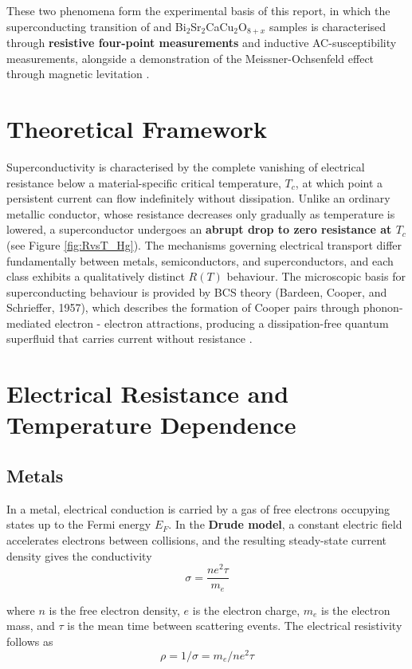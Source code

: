 \documentclass[a4paper,11pt]{article}
\numberwithin{equation}{section}
\begin{document}
These two phenomena form the experimental basis of this report, in which the 
superconducting transition of  and Bi$_2$Sr$_2$CaCu$_2$O$_{8+x}$ samples
is characterised through \textbf{resistive four-point measurements} and inductive 
AC-susceptibility measurements, alongside a demonstration of the 
Meissner-Ochsenfeld effect through magnetic levitation \cite{experiment}.


\newpage

\section{Theoretical Framework}
Superconductivity is characterised by the complete vanishing of electrical 
resistance below a material-specific critical temperature, $T_c$, at which 
point a persistent current can flow indefinitely without dissipation. 
Unlike an ordinary metallic conductor, whose resistance decreases only 
gradually as temperature is lowered, a superconductor undergoes an \textbf{abrupt 
drop to zero resistance at $T_c$} (see Figure \ref{fig:RvsT_Hg}). The mechanisms governing 
electrical transport differ fundamentally between metals, semiconductors, 
and superconductors, and each class exhibits a qualitatively distinct 
$R(T)$ behaviour. The microscopic basis for superconducting behaviour is 
provided by BCS theory (Bardeen, Cooper, and Schrieffer, 1957), which 
describes the formation of Cooper pairs through phonon-mediated 
electron - electron attractions, producing a dissipation-free quantum 
superfluid that carries current without resistance \cite{wiki_super}.


\section{Electrical Resistance and Temperature Dependence}
\subsection{Metals}
In a metal, electrical conduction is carried by a gas of free electrons 
occupying states up to the Fermi energy $E_F$. In the \textbf{Drude model}, a 
constant electric field accelerates electrons between collisions, and the 
resulting steady-state current density gives the conductivity \cite{Kittel2005}
\begin{equation}
    \sigma = \frac{ne^2\tau}{m_e}
    \label{eq:drude}
\end{equation}

where $n$ is the free electron density, $e$ is the electron charge, $m_e$ 
is the electron mass, and $\tau$ is the mean time between scattering events. 
The electrical resistivity follows as 
\begin{equation}
    \rho = 1/\sigma = m_e/ne^2\tau
    \label{eq:resistivity}
\end{equation}
\end{document}

